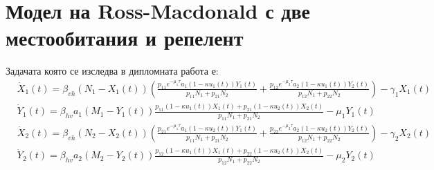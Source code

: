\section{Модел на Ross-Macdonald с две местообитания и репелент}
Задачата която се изследва в дипломната работа е:
\begin{equation}
  \label{eq:TheProblem}
  \begin{split}
    &\dot{X}_1(t) = \beta_{vh} (N_1-X_1(t)) \left(\frac{p_{11} e^{-\mu_1 \tau} a_1 (1-\kappa u_1(t)) Y_1(t)}{p_{11} N_1 + p_{21} N_2} + \frac{p_{12} e^{-\mu_2 \tau} a_2 (1-\kappa u_1(t)) Y_2(t)}{p_{12} N_1 + p_{22} N_2}\right) - \gamma_1 X_1(t) \\
    &\dot{Y}_1(t) = \beta_{hv} a_1 (M_1-Y_1(t)) \frac{p_{11} (1-\kappa u_1(t)) X_1(t) + p_{21} (1-\kappa u_2(t)) X_2(t)}{p_{11} N_1 + p_{21} N_2} - \mu_1 Y_1(t) \\
    &\dot{X}_2(t) = \beta_{vh} (N_2-X_2(t)) \left(\frac{p_{21} e^{-\mu_1 \tau} a_1 (1-\kappa u_2(t)) Y_1(t)}{p_{11} N_1 + p_{21} N_2} + \frac{p_{22} e^{-\mu_2 \tau} a_2 (1-\kappa u_2(t)) Y_2(t)}{p_{12} N_1 + p_{22} N_2}\right) - \gamma_2 X_2(t) \\
    &\dot{Y}_2(t) = \beta_{hv} a_2 (M_2-Y_2(t)) \frac{p_{12} (1-\kappa u_1(t)) X_1(t) + p_{22} (1-\kappa u_2(t)) X_2(t)}{p_{12} N_1 + p_{22} N_2} - \mu_2 Y_2(t)
  \end{split}
  \end{equation}

